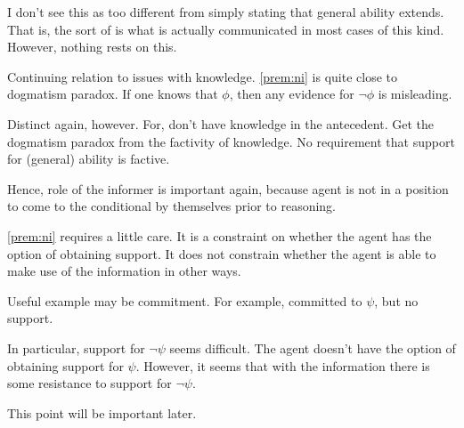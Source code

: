 \begin{note}[Aside]
  I don't see this as too different from simply stating that general ability extends.
  That is, the sort of \gsi{} is what is actually communicated in most cases of this kind.
  However, nothing rests on this.
\end{note}

\begin{note}[Dogmatism]
  Continuing relation to issues with knowledge.
  \autoref{prem:ni} is quite close to dogmatism paradox.
  If one knows that \(\phi\), then any evidence for \(\lnot \phi\) is misleading.

  Distinct again, however.
  For, don't have knowledge in the antecedent.
  Get the dogmatism paradox from the factivity of knowledge.
  No requirement that support for (general) ability is factive.

  Hence, role of the informer is important again, because agent is not in a position to come to the conditional by themselves prior to reasoning.
\end{note}


\begin{note}
  \ref{prem:ni} requires a little care.
  It is a constraint on whether the agent has the option of obtaining support.
  It does not constrain whether the agent is able to make use of the information in other ways.

  Useful example may be commitment.
  For example, committed to \(\psi\), but no support.

  In particular, support for \(\lnot\psi\) seems difficult.
  The agent doesn't have the option of obtaining support for \(\psi\).
  However, it seems that with the information there is some resistance to support for \(\lnot\psi\).

  This point will be important later.
\end{note}

